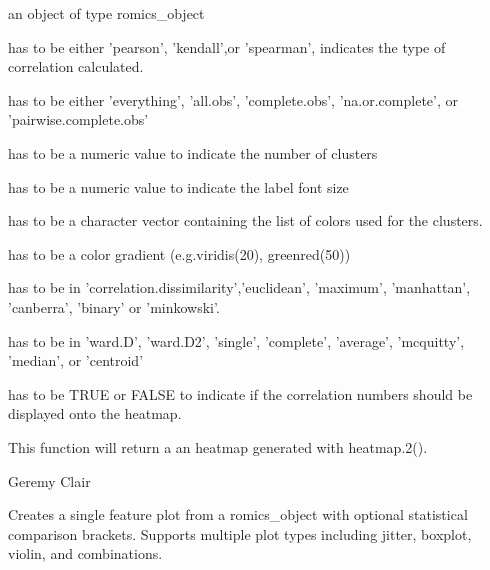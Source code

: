 \documentclass[a4paper]{book}
\begin{document}
\begin{Arguments}
\begin{ldescription}
\item[\code{romics\_object}] an object of type romics\_object

\item[\code{corr\_type}] has to be either 'pearson', 'kendall',or 'spearman', indicates the type of correlation calculated.

\item[\code{use}] has to be either 'everything', 'all.obs', 'complete.obs', 'na.or.complete', or 'pairwise.complete.obs'

\item[\code{number\_of\_clusters}] has to be a numeric value to indicate the number of clusters

\item[\code{cex}] has to be a numeric value to indicate the label font size

\item[\code{cluster\_colors}] has to be a character vector containing the list of colors used for the clusters.

\item[\code{heatmap\_col}] has to be a color gradient (e.g.viridis(20), greenred(50))

\item[\code{dist\_method}] has to be in 'correlation.dissimilarity','euclidean', 'maximum', 'manhattan', 'canberra', 'binary' or 'minkowski'.

\item[\code{hclust\_method}] has to be in 'ward.D', 'ward.D2', 'single', 'complete', 'average', 'mcquitty', 'median', or 'centroid'

\item[\code{cellnote}] has to be TRUE or FALSE to indicate if the correlation numbers should be displayed onto the heatmap.
\end{ldescription}
\end{Arguments}
%
\begin{Value}
This function will return a an heatmap generated with heatmap.2().
\end{Value}
%
\begin{Author}
Geremy Clair
\end{Author}
%
\begin{Description}
Creates a single feature plot from a romics\_object with optional statistical comparison brackets. Supports multiple plot types including jitter, boxplot, violin, and combinations.
\end{Description}
\end{document}
